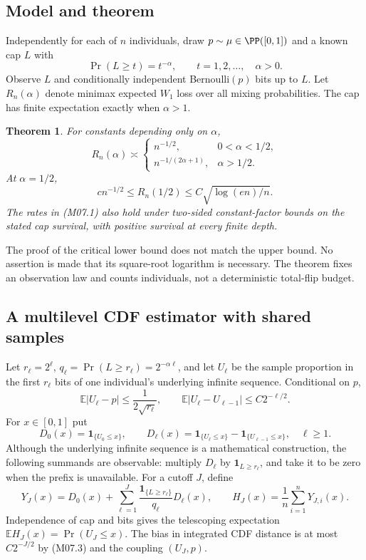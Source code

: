 \documentclass[11pt,a4paper]{article}
\newtheorem{theorem}{Theorem}[section]
\theoremstyle{definition}\newtheorem{definition}[theorem]{Definition}
\theoremstyle{remark}\newtheorem{remark}[theorem]{Remark}
\newcommand{\E}{\mathbb E}\newcommand{\one}{\mathbf 1}\newcommand{\1}{\mathbf 1}
\numberwithin{equation}{section}
\begin{document}
\subsection{Model and theorem}\label{M07-sec-1}
Independently for each of $n$ individuals, draw $p\sim\mu\in\PP([0,1])$ and a known cap $L$ with
\[
 \Pr(L\ge t)=t^{-\alpha},\qquad t=1,2,\ldots,\quad\alpha>0.
\]
Observe $L$ and conditionally independent Bernoulli$(p)$ bits up to $L$. Let $R_n(\alpha)$ denote minimax expected $W_1$ loss over all mixing probabilities. The cap has finite expectation exactly when $\alpha>1$.

\begin{theorem}\label{M07-th:main}
For constants depending only on $\alpha$,
\[
 R_n(\alpha)\asymp
 \begin{cases}
 n^{-1/2},&0<\alpha<1/2,\\
 n^{-1/(2\alpha+1)},&\alpha>1/2.
 \end{cases}\tag{M07.1}
\]
At $\alpha=1/2$,
\[
 c n^{-1/2}\le R_n(1/2)\le C\sqrt{\log(en)/n}.\tag{M07.2}
\]
The rates in (M07.1) also hold under two-sided constant-factor bounds on the stated cap survival, with positive survival at every finite depth.
\end{theorem}
The proof of the critical lower bound does not match the upper bound. No assertion is made that its square-root logarithm is necessary. The theorem fixes an observation law and counts individuals, not a deterministic total-flip budget.

\subsection{A multilevel CDF estimator with shared samples}\label{M07-sec-2}
Let $r_\ell=2^\ell$, $q_\ell=\Pr(L\ge r_\ell)=2^{-\alpha\ell}$, and let $U_\ell$ be the sample proportion in the first $r_\ell$ bits of one individual's underlying infinite sequence. Conditional on $p$,
\[
 \E|U_\ell-p|\le\frac1{2\sqrt{r_\ell}},\qquad
 \E|U_\ell-U_{\ell-1}|\le C2^{-\ell/2}.\tag{M07.3}
\]
For $x\in[0,1]$ put
\[
 D_0(x)=\1_{\{U_0\le x\}},\qquad
 D_\ell(x)=\1_{\{U_\ell\le x\}}-\1_{\{U_{\ell-1}\le x\}},\quad\ell\ge1.
\]
Although the underlying infinite sequence is a mathematical construction, the following summands are observable: multiply $D_\ell$ by $\1_{L\ge r_\ell}$, and take it to be zero when the prefix is unavailable. For a cutoff $J$, define
\[
 Y_J(x)=D_0(x)+\sum_{\ell=1}^J\frac{\1_{\{L\ge r_\ell\}}}{q_\ell}D_\ell(x),
 \qquad H_J(x)=\frac1n\sum_{i=1}^nY_{J,i}(x).
\tag{M07.4}
\]
Independence of cap and bits gives the telescoping expectation
$\E H_J(x)=\Pr(U_J\le x)$. The bias in integrated CDF distance is at most $C2^{-J/2}$ by (M07.3) and the coupling $(U_J,p)$.
\end{document}
